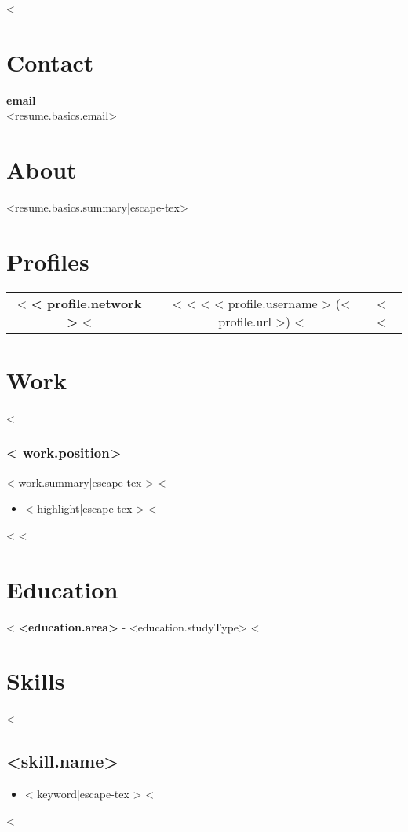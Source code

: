 \documentclass{resume}
\begin{document}
<%
\section{Contact}
\textbf{email}\\
<{resume.basics.email}>
\section{About}
<{resume.basics.summary|escape-tex}>
\section{Profiles}
\begin{center}
  \begin{tabular}{ c c }
    <%
    \textbf{<{ profile.network }>}
    <%
    &
    <%
    <%
    <%
    <{ profile.username }> (<{ profile.url }>)
    <%
    &
    <%
    <%
  \end{tabular}
\end{center}
\section{Work}
<%
\subsubsection{<{ work.position}>}
<{ work.summary|escape-tex }>
<%
\begin{itemize}
<%
  \item <{ highlight|escape-tex }>
<%
\end{itemize}
<%
<%
\section{Education}
<%
\textbf{<{education.area}>} - <{education.studyType}>
<%
\section{Skills}
\begin{multicols}{2}
<%
\subsection{<{skill.name}>}
\begin{itemize}
  \setlength\itemsep{0.1em}
  <%
  \item <{ keyword|escape-tex }>
  <%
\end{itemize}
\vspace{0.5em}
<%
\end{multicols}
\end{document}
